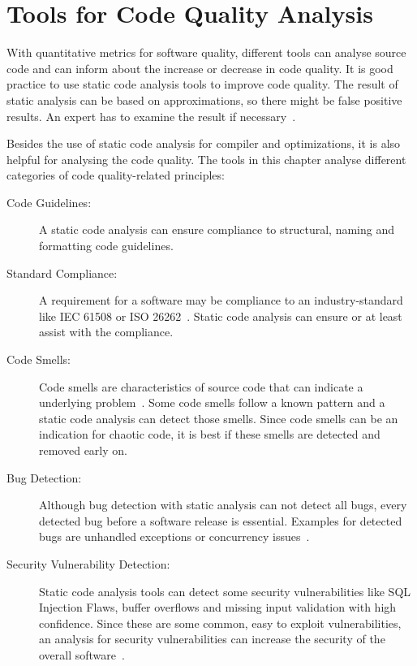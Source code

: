\section{Tools for Code Quality Analysis}\label{sec:tool_comparison}
With quantitative metrics for software quality, different tools can analyse source code and can inform about the increase or decrease in code quality. It is good practice to use static code analysis tools to improve code quality. The result of static analysis can be based on approximations, so there might be false positive results. An expert has to examine the result if necessary~\cite{prahofer_static_2017}.

Besides the use of static code analysis for compiler and optimizations, it is also helpful for analysing the code quality. The tools in this chapter analyse different categories of code quality-related principles:
\begin{description}
    \item[Code Guidelines:] A static code analysis can ensure compliance to structural, naming and formatting code guidelines. 
    \item[Standard Compliance:] A requirement for a software may be compliance to an industry-standard like IEC 61508 or ISO 26262~\cite{tc_65sc_65a_iec_2010-1,isotc_22sc_32_iso_2018}. Static code analysis can ensure or at least assist with the compliance.  
    \item[Code Smells:] Code smells are characteristics of source code that can indicate a underlying problem~\cite{fowler2018refactoring}. Some code smells follow a known pattern and a static code analysis can detect those smells. Since code smells can be an indication for chaotic code, it is best if these smells are detected and removed early on.
    \item[Bug Detection:] Although bug detection with static analysis can not detect all bugs, every detected bug before a software release is essential. Examples for detected bugs are unhandled exceptions or concurrency issues~\cite{delaitre_evaluating_2015}.
    \item[Security Vulnerability Detection:] Static code analysis tools can detect some security vulnerabilities like SQL Injection Flaws, buffer overflows and missing input validation with high confidence. Since these are some common, easy to exploit vulnerabilities, an analysis for security vulnerabilities can increase the security of the overall software~\cite{wichers_source_nodate}.  
\end{description}

